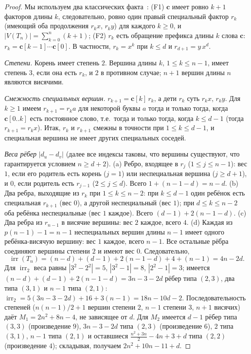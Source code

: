 \documentclass[a4paper,14pt]{extreport}
\theoremstyle{plain}
\theoremstyle{definition}
\theoremstyle{remark}
\begin{document}
\begin{proof}
	Мы используем два классических факта~\cite{Lothaire2002}: (F1) $\mathbf c$ имеет ровно $k+1$ факторов длины $k$, следовательно, ровно один правый специальный фактор $r_k$ (имеющий оба продолжения $r_kx$, $r_ky$) для каждого $k\ge0$, и $|V(T_n)|=\sum_{k=0}^n(k+1)$;
	(F2) $r_k$ есть обращение префикса длины $k$ слова $\mathbf c$: $r_k=\mathbf c[k-1]\cdots\mathbf c[0]$. В частности, $r_k=x^k$ при $k\le d$ и $r_{d+1}=y\,x^d$.
	
	\emph{Степени.} Корень имеет степень $2$. Вершина длины $k$, $1\le k\le n-1$, имеет степень $3$, если она есть $r_k$, и $2$ в противном случае; $n+1$ вершин длины $n$ являются висячими.
	
	\emph{Смежность специальных вершин.} $r_{k+1}=\mathbf c[k]\,r_k$, а дети $r_k$ суть $r_kx$, $r_ky$. Для $k\ge1$ имеем $r_{k+1}=r_ka$ для некоторой буквы $a$ тогда и только тогда, когда $\mathbf c[0..k]$ есть постоянное слово, т.е.\ тогда и только тогда, когда $k\le d-1$
	(тогда $r_{k+1}=r_kx$). Итак, $r_k$ и $r_{k+1}$ смежны в точности при $1\le k\le d-1$, и специальная вершина не имеет других специальных соседей.
	
	\emph{Веса рёбер} $|d_u-d_v|$ (далее все индексы таковы, что вершины существуют, что гарантируется условием $n\ge d+2$).
	(a) Ребро, входящее в $r_j$ ($1\le j\le n-1$): вес $1$, если его родитель есть корень ($j=1$) или неспециальная вершина ($j\ge d+1$), и $0$, если родитель есть $r_{j-1}$ ($2\le j\le d$). Всего $1+(n-1-d)=n-d$.
	(b) Два ребра, выходящие из $r_k$ при $1\le k\le n-2$: при $k\le d-1$ один ребёнок есть специальная $r_{k+1}$ (вес $0$), а другой неспециальный (вес $1$); при $d\le k\le n-2$ оба ребёнка неспециальные (вес $1$ каждое).
	Всего $(d-1)+2(n-1-d)$.
	(c) Два ребра из $r_{n-1}$ в висячие вершины: вес $2$ каждое, всего $4$.
	(d) Каждая из $p(n-1)-1=n-1$ неспециальных вершин длины $n-1$ имеет одного ребёнка-висячую вершину: вес $1$ каждое, всего $n-1$.
	Все остальные рёбра соединяют вершины степени $2$ и имеют вес $0$. Следовательно,
	\begin{equation}
		\operatorname{irr}(T_n)=(n-d)+(d-1)+2(n-1-d)+4+(n-1)=4n-2d .
	\end{equation}
	Для $\operatorname{irr}_2$ веса равны $|3^2-2^2|=5$, $|3^2-1|=8$, $|2^2-1|=3$; имеется $(n-d)+(d-1)+2(n-1-d)=3n-3-2d$ рёбер типа $(2,3)$, два типа $(3,1)$ и $n-1$ типа $(2,1)$:
	$\operatorname{irr}_2=5(3n-3-2d)+16+3(n-1)=18n-10d-2$.
	Последовательность степеней ($n(n-1)/2+1$ вершин степени $2$, $n-1$ степени $3$, $n+1$ висячих) даёт $M_1=2n^2+8n-4$, не зависящее от $d$.
	Для $M_2$ имеется $d-1$ рёбер типа $(3,3)$ (произведение $9$), $3n-3-2d$ типа $(2,3)$ (произведение $6$), $2$ типа $(3,1)$, $n-1$ типа $(2,1)$ и оставшиеся $\frac{n^2+3n}2-4n+3+d$ типа $(2,2)$ (произведение $4$);
	складывая, получаем $2n^2+10n-11+d$.
\end{proof}
\end{document}
